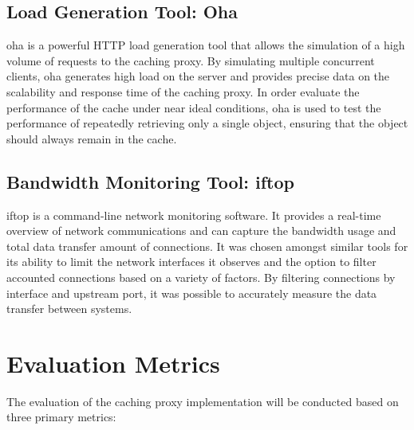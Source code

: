 \subsection{Load Generation Tool: Oha}
\label{oha}
oha is a powerful HTTP load generation tool that allows the simulation of a high volume of requests to the caching proxy. By simulating multiple concurrent clients, oha generates high load on the server and provides precise data on the scalability and response time of the caching proxy. In order evaluate the performance of the cache under near ideal conditions, oha is used to test the performance of repeatedly retrieving only a single object, ensuring that the object should always remain in the cache.

\subsection{Bandwidth Monitoring Tool: iftop}

iftop\cite{iftop} is a command-line network monitoring software. It provides a real-time overview of network communications and can capture the bandwidth usage and total data transfer amount of connections. It was chosen amongst similar tools for its ability to limit the network interfaces it observes and the option to filter accounted connections based on a variety of factors. By filtering connections by interface and upstream port, it was possible to accurately measure the data transfer between systems.


\section{Evaluation Metrics}

The evaluation of the caching proxy implementation will be conducted based on three primary metrics:

